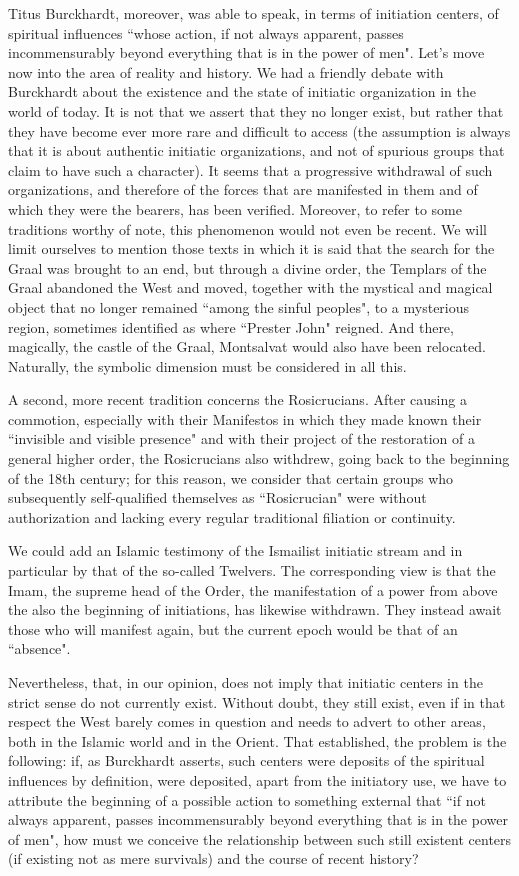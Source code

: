 Titus Burckhardt, moreover, was able to speak, in terms of initiation centers, of spiritual influences ``whose action, if not always apparent, passes incommensurably beyond everything that is in the power of men". Let's move now into the area of reality and history. We had a friendly debate with Burckhardt about the existence and the state of initiatic organization in the world of today. It is not that we assert that they no longer exist, but rather that they have become ever more rare and difficult to access (the assumption is always that it is about authentic initiatic organizations, and not of spurious groups that claim to have such a character). It seems that a progressive withdrawal of such organizations, and therefore of the forces that are manifested in them and of which they were the bearers, has been verified. Moreover, to refer to some traditions worthy of note, this phenomenon would not even be recent. We will limit ourselves to mention those texts in which it is said that the search for the Graal was brought to an end, but through a divine order, the Templars of the Graal abandoned the West and moved, together with the mystical and magical object that no longer remained ``among the sinful peoples", to a mysterious region, sometimes identified as where ``Prester John" reigned. And there, magically, the castle of the Graal, Montsalvat would also have been relocated. Naturally, the symbolic dimension must be considered in all this.

A second, more recent tradition concerns the Rosicrucians. After causing a commotion, especially with their Manifestos in which they made known their ``invisible and visible presence" and with their project of the restoration of a general higher order, the Rosicrucians also withdrew, going back to the beginning of the 18th century; for this reason, we consider that certain groups who subsequently self-qualified themselves as ``Rosicrucian" were without authorization and lacking every regular traditional filiation or continuity.

We could add an Islamic testimony of the Ismailist initiatic stream and in particular by that of the so-called Twelvers. The corresponding view is that the Imam, the supreme head of the Order, the manifestation of a power from above the also the beginning of initiations, has likewise withdrawn. They instead await those who will manifest again, but the current epoch would be that of an ``absence".

Nevertheless, that, in our opinion, does not imply that initiatic centers in the strict sense do not currently exist. Without doubt, they still exist, even if in that respect the West barely comes in question and needs to advert to other areas, both in the Islamic world and in the Orient. That established, the problem is the following: if, as Burckhardt asserts, such centers were deposits of the spiritual influences by definition, were deposited, apart from the initiatory use, we have to attribute the beginning of a possible action to something external that ``if not always apparent, passes incommensurably beyond everything that is in the power of men", how must we conceive the relationship between such still existent centers (if existing not as mere survivals) and the course of recent history?

